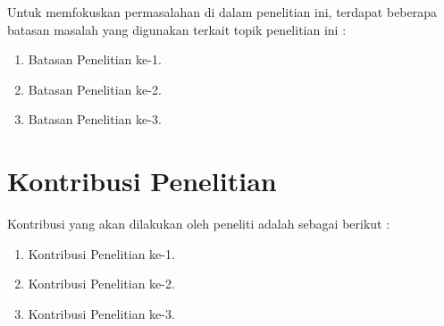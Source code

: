 Untuk memfokuskan permasalahan di dalam penelitian ini, terdapat beberapa batasan masalah yang digunakan terkait topik penelitian ini :

\begin{enumerate}
    \item Batasan Penelitian ke-1.
    \item Batasan Penelitian ke-2.
    \item Batasan Penelitian ke-3.
\end{enumerate}

\section{Kontribusi Penelitian}

Kontribusi yang akan dilakukan oleh peneliti adalah sebagai berikut :

\begin{enumerate}
    \item Kontribusi Penelitian ke-1.
    \item Kontribusi Penelitian ke-2.
    \item Kontribusi Penelitian ke-3.
\end{enumerate}
